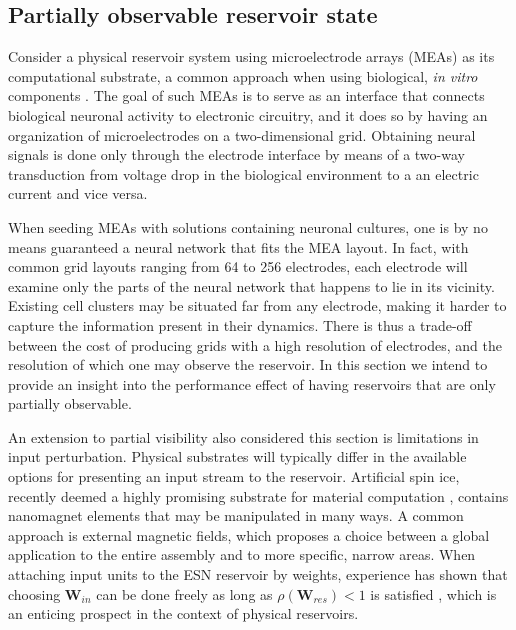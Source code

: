 \subsection{Partially observable reservoir state}

Consider a physical reservoir system using microelectrode arrays (MEAs) as its
computational substrate, a common approach when using biological, \textit{in
vitro} components \cite{aaser_towards_2017}. The goal of such MEAs is to serve
as an interface that connects biological neuronal activity to electronic
circuitry, and it does so by having an organization of microelectrodes on a
two-dimensional grid. Obtaining neural signals is done only through the
electrode interface by means of a two-way transduction from voltage drop in the
biological environment to a an electric current and vice versa.

When seeding MEAs with solutions containing neuronal cultures, one is by no
means guaranteed a neural network that fits the MEA layout. In fact, with common
grid layouts ranging from 64 to 256 electrodes, each electrode will examine only
the parts of the neural network that happens to lie in its vicinity. Existing
cell clusters may be situated far from any electrode, making it harder to
capture the information present in their dynamics. There is thus a trade-off
between the cost of producing grids with a high resolution of electrodes, and
the resolution of which one may observe the reservoir. In this section we intend
to provide an insight into the performance effect of having reservoirs that are
only partially observable.

An extension to partial visibility also considered this section is limitations
in input perturbation. Physical substrates will typically differ in the
available options for presenting an input stream to the reservoir. Artificial
spin ice, recently deemed a highly promising substrate for material computation
\cite{jensen_computation_2018}, contains nanomagnet elements that may be
manipulated in many ways. A common approach is external magnetic fields, which
proposes a choice between a global application to the entire assembly and to
more specific, narrow areas. When attaching input units to the ESN reservoir by
weights, experience has shown that choosing $\mathbf{W}_{in}$ can be done freely
as long as $\rho(\mathbf{W}_{res}) < 1$ is satisfied \cite{jaeger_echo_2001},
which is an enticing prospect in the context of physical reservoirs.

